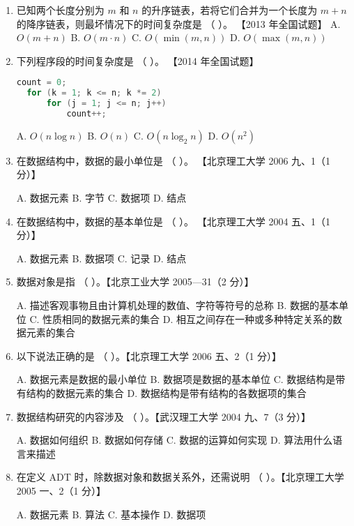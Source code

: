 \documentclass[lang=cn,newtx,10pt,scheme=chinese]{elegantbook}
\begin{document}
\begin{enumerate}
  \item 已知两个长度分别为 $m$ 和 $n$ 的升序链表，若将它们合并为一个长度为 $m + n$ 的降序链表，则最坏情况下的时间复杂度是 （ \quad）。  
  【2013 年全国试题】  
  A. $O(m + n)$ \quad B. $O(m \cdot n)$ \quad C. $O(\min(m, n))$ \quad D. $O(\max(m, n))$

  \item 下列程序段的时间复杂度是 （ \quad）。  
  【2014 年全国试题】  
  \begin{lstlisting}[language=C]
  count = 0;
  for (k = 1; k <= n; k *= 2)
      for (j = 1; j <= n; j++)
          count++;
  \end{lstlisting}
  A. $O(n \log n)$ \quad B. $O(n)$ \quad C. $O(n \log_2 n)$ \quad D. $O(n^2)$

  \item 在数据结构中，数据的最小单位是 （ \quad）。  
  【北京理工大学 2006 九、1（1 分）】  

  A. 数据元素 \quad B. 字节 \quad C. 数据项 \quad D. 结点

  \item 在数据结构中，数据的基本单位是 （ \quad）。  
  【北京理工大学 2004 五、1（1 分）】  
  
  A. 数据元素 \quad B. 数据项 \quad C. 记录 \quad D. 结点

  \item 数据对象是指 （ \quad）。【北京工业大学 2005—31（2 分）】  
   
  A. 描述客观事物且由计算机处理的数值、字符等符号的总称  
    B. 数据的基本单位  
    C. 性质相同的数据元素的集合  
    D. 相互之间存在一种或多种特定关系的数据元素的集合  

    \item 以下说法正确的是 （ \quad）。【北京理工大学 2006 五、2（1 分）】  
   
    A. 数据元素是数据的最小单位  
    B. 数据项是数据的基本单位  
    C. 数据结构是带有结构的数据元素的集合  
    D. 数据结构是带有结构的各数据项的集合  

    \item 数据结构研究的内容涉及 （ \quad）。【武汉理工大学 2004 九、7（3 分）】  
   
    A. 数据如何组织  
    B. 数据如何存储  
    C. 数据的运算如何实现  
    D. 算法用什么语言来描述  

    \item 在定义 ADT 时，除数据对象和数据关系外，还需说明 （ \quad）。【北京理工大学 2005 一、2（1 分）】  
   
    A. 数据元素  
    B. 算法  
    C. 基本操作  
    D. 数据项  


\end{enumerate}
\end{document}

